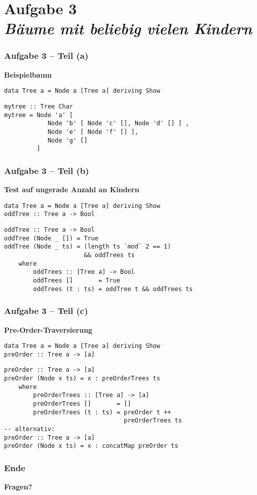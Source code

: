 \documentclass{beamer}
\begin{document}

\section{Aufgabe 3 \\ \itshape \normalsize Bäume mit beliebig vielen Kindern}

\begin{frame}[t, fragile] \frametitle{Aufgabe 3 -- Teil (a)}
	\textbf{Beispielbaum}
	
	\begin{lstlisting}[style=bg]
data Tree a = Node a [Tree a] deriving Show				 
	\end{lstlisting}
	
	
	\pause \bigskip
	
	\begin{lstlisting}[style=bg]
mytree :: Tree Char
mytree = Node 'a' [ 
			Node 'b' [ Node 'c' [], Node 'd' [] ] ,
			Node 'e' [ Node 'f' [] ],
			Node 'g' []
		 ]
	\end{lstlisting}
\end{frame}

\begin{frame}[t, fragile] \frametitle{Aufgabe 3 -- Teil (b)}
	\textbf{Test auf ungerade Anzahl an Kindern}
	
	\begin{lstlisting}[style=bg]
data Tree a = Node a [Tree a] deriving Show	
oddTree :: Tree a -> Bool			 
	\end{lstlisting}
	
	\pause \bigskip
	
	\begin{lstlisting}[style=bg]
oddTree :: Tree a -> Bool
oddTree (Node _ []) = True
oddTree (Node _ ts) = (length ts `mod` 2 == 1)
                      && oddTrees ts
	where 
		oddTrees :: [Tree a] -> Bool
		oddTrees []       = True
		oddTrees (t : ts) = oddTree t && oddTrees ts
	\end{lstlisting}
\end{frame}

\begin{frame}[t, fragile] \frametitle{Aufgabe 3 -- Teil (c)}
	\textbf{Pre-Order-Traversierung}
	
	\begin{lstlisting}[style=bg]
data Tree a = Node a [Tree a] deriving Show	
preOrder :: Tree a -> [a]			 
	\end{lstlisting}
	
	\pause \bigskip
	
	\begin{lstlisting}[style=bg]
preOrder :: Tree a -> [a]
preOrder (Node x ts) = x : preOrderTrees ts
	where
		preOrderTrees :: [Tree a] -> [a]
		preOrderTrees []       = []
		preOrderTrees (t : ts) = preOrder t ++ 
		                         preOrderTrees ts
-- alternativ:		                         
preOrder :: Tree a -> [a]
preOrder (Node x ts) = x : concatMap preOrder ts		                         
	\end{lstlisting}
\end{frame}


\begin{frame} \frametitle{Ende}
	\centering
	\textbf{Fragen?}
\end{frame}
\end{document}
